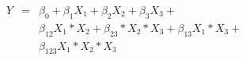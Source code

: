 

\[
\begin{array}{lll} Y & = & \beta_{0} + \beta_{1}X_1 + \beta_{2}X_2 + \beta_{3}X_3 + \\ &   & \beta_{12}X_1*X_2 + \beta_{23}*X_2*X_3 + \beta_{13}X_1*X_3 + \\ &   & \beta_{123}X_1*X_2*X_3 \end{array}

\]


